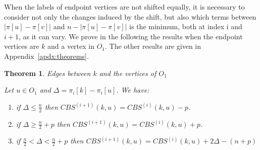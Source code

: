 \documentclass{scrartcl}
\theoremstyle{plain}
\newtheorem{theorem}{Theorem}[section]
\newcommand{\cbs}{CBS}
\begin{document}
When the labels of endpoint vertices are not shifted equally, it is necessary to 
consider not only the changes induced by the shift, but also which terms between 
$|\pi[u] - \pi[v]|$ and $n-|\pi[u] - \pi[v]|$ is the minimum, both at index i 
and $i+1$, as it can vary. We prove in the following the results when the 
endpoint vertices are $k$ and a vertex in $O_1$. The other results are given in 
Appendix~\ref{apdx:theorems}.

\begin{theorem}{Edges between $k$ and the vertices of $O_1$}

\label{thm:k01}
Let $u \in O_1$ and $\Delta = \pi_i[k] - \pi_i[u]$. We have:
\begin{enumerate}
\item if $\Delta \leq \frac{n}{2}$ then
  $\cbs{}^{(i+1)}(k,u)=\cbs{}^{(i)}(k,u)-p$.
\item if $\Delta \geq \frac{n}{2} + p$ then
  $\cbs{}^{(i+1)}(k,u)=\cbs{}^{(i)}(k,u)+p$.
\item  if $\frac{n}{2} <  \Delta < \frac{n}{2} + p $  then 
$\cbs{}^{(i+1)}(k,u)=\cbs{}^{(i)}(k,u)+2\Delta - (n+p)$

\end{enumerate}

\end{theorem}
\end{document}
